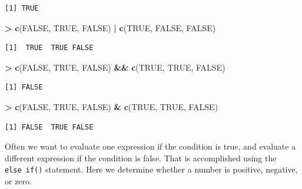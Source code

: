 \documentclass[]{krantz}
\makeatletter
\newenvironment{Shaded}{\begin{snugshade}}{\end{snugshade}}
\newcommand{\KeywordTok}[1]{\textcolor[rgb]{0.27,0.27,0.27}{\textbf{#1}}}
\newcommand{\NormalTok}[1]{#1}
\newcommand{\OperatorTok}[1]{\textcolor[rgb]{0.43,0.43,0.43}{\textbf{#1}}}
\newcommand{\OtherTok}[1]{\textcolor[rgb]{0.37,0.37,0.37}{#1}}
\newcommand{\StringTok}[1]{\textcolor[rgb]{0.5,0.5,0.5}{#1}}
\newenvironment{kframe}{%
\medskip{}
\setlength{\fboxsep}{.8em}
 \def\at@end@of@kframe{}%
 \ifinner\ifhmode%
  \def\at@end@of@kframe{\end{minipage}}%
  \begin{minipage}{\columnwidth}%
 \fi\fi%
 \def\FrameCommand##1{\hskip\@totalleftmargin \hskip-\fboxsep
 \colorbox{shadecolor}{##1}\hskip-\fboxsep
     \hskip-\linewidth \hskip-\@totalleftmargin \hskip\columnwidth}%
 \MakeFramed {\advance\hsize-\width
   \@totalleftmargin\z@ \linewidth\hsize
   \@setminipage}}%
 {\par\unskip\endMakeFramed%
 \at@end@of@kframe}
\renewenvironment{Shaded}{\begin{kframe}}{\end{kframe}}
\makeatother
\begin{document}
\begin{verbatim}
[1] TRUE
\end{verbatim}

\begin{Shaded}
\begin{Highlighting}[]
\OperatorTok{>}\StringTok{ }\KeywordTok{c}\NormalTok{(}\OtherTok{FALSE}\NormalTok{, }\OtherTok{TRUE}\NormalTok{, }\OtherTok{FALSE}\NormalTok{) }\OperatorTok{|}\StringTok{ }\KeywordTok{c}\NormalTok{(}\OtherTok{TRUE}\NormalTok{, }\OtherTok{FALSE}\NormalTok{, }\OtherTok{FALSE}\NormalTok{)}
\end{Highlighting}
\end{Shaded}

\begin{verbatim}
[1]  TRUE  TRUE FALSE
\end{verbatim}

\begin{Shaded}
\begin{Highlighting}[]
\OperatorTok{>}\StringTok{ }\KeywordTok{c}\NormalTok{(}\OtherTok{FALSE}\NormalTok{, }\OtherTok{TRUE}\NormalTok{, }\OtherTok{FALSE}\NormalTok{) }\OperatorTok{&&}\StringTok{ }\KeywordTok{c}\NormalTok{(}\OtherTok{TRUE}\NormalTok{, }\OtherTok{TRUE}\NormalTok{, }\OtherTok{FALSE}\NormalTok{)}
\end{Highlighting}
\end{Shaded}

\begin{verbatim}
[1] FALSE
\end{verbatim}

\begin{Shaded}
\begin{Highlighting}[]
\OperatorTok{>}\StringTok{ }\KeywordTok{c}\NormalTok{(}\OtherTok{FALSE}\NormalTok{, }\OtherTok{TRUE}\NormalTok{, }\OtherTok{FALSE}\NormalTok{) }\OperatorTok{&}\StringTok{ }\KeywordTok{c}\NormalTok{(}\OtherTok{TRUE}\NormalTok{, }\OtherTok{TRUE}\NormalTok{, }\OtherTok{FALSE}\NormalTok{)}
\end{Highlighting}
\end{Shaded}

\begin{verbatim}
[1] FALSE  TRUE FALSE
\end{verbatim}

Often we want to evaluate one expression if the condition is true, and evaluate a different expression if the condition is false. That is accomplished using the \texttt{else\ if()} statement. Here we determine whether a number is positive, negative, or zero.
\end{document}
